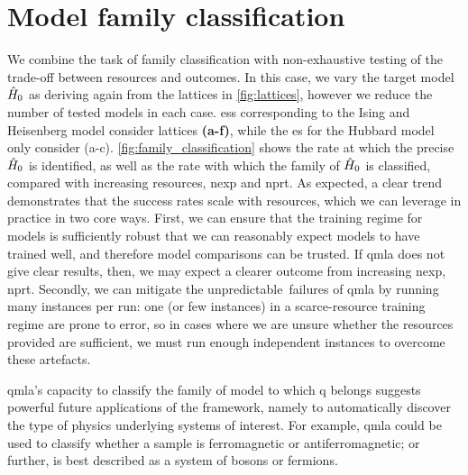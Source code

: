 \section{Model family classification}\label{sec:family_classification}
We combine the task of family classification 
with non-exhaustive testing of the trade-off between resources and outcomes.
In this case, we vary the target model $\hat{H}_0$ as deriving again from the lattices in 
\cref{fig:lattices}, 
however we reduce the number of tested models in each case. 
\glspl{es} corresponding to the Ising and Heisenberg model consider lattices \textbf{(a-f)}, 
while the \gls{es} for the Hubbard model only consider (a-c). 
\cref{fig:family_classification} shows the rate at which the precise $\hat{H}_0$ is identified, 
as well as the rate with which the family of $\hat{H}_0$ is classified, 
compared with increasing resources, \gls{nexp} and \gls{nprt}. 
As expected, a clear trend demonstrates that the success rates scale with resources,
which we can leverage in practice in two core ways.
First, we can ensure that the training regime for models is sufficiently robust 
that we can reasonably expect models to have trained well, and therefore model comparisons can be trusted.
If \gls{qmla} does not give clear results, then, we may expect a clearer outcome from increasing \gls{nexp}, \gls{nprt}.
Secondly, we can mitigate the unpredictable\footnotemark \ failures of \gls{qmla} by running many \glspl{instance} per \gls{run}:
one (or few \glspl{instance}) in a scarce-resource training regime are prone to error, 
so in cases where we are unsure whether the resources provided are sufficient, 
we must run enough independent \glspl{instance} to overcome these artefacts. 
\par 

\gls{qmla}'s capacity to classify the family of model to which \gls{q} belongs suggests powerful 
future applications of the framework, namely to automatically discover the type of physics underlying 
systems of interest.
For example, \gls{qmla} could be used to classify whether a sample is ferromagnetic or antiferromagnetic;
or further, is best described as a system of bosons or fermions.


